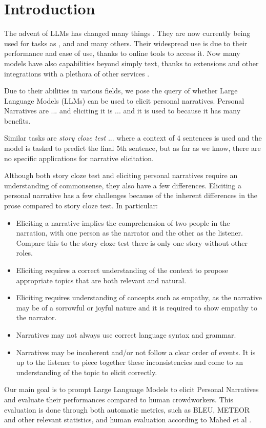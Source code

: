 \chapter{Introduction}
\label{cha:intro}
The advent of LLMs has changed many things \cite{}. They are now currently being used for tasks as \cite{}, \cite{} and \cite{} and many others. Their widespread use is due to their performance and ease of use, thanks to online tools to access it. Now \cite{} many models have also capabilities beyond simply text, thanks to extensions and other integrations with a plethora of other services \cite{}.

Due to their abilities in various fields, we pose the query of whether Large Language Models (LLMs) can be used to elicit personal narratives.
Personal Narratives are ... \cite{} and eliciting it is ...\cite{} and it is used to \cite{} because it has many benefits. 

Similar tasks are \emph{story cloze test} \cite{} ... where a context of 4 sentences is used and the model is tasked to predict the final 5th sentence, but as far as we know, there are no specific applications for narrative elicitation. 

Although both story cloze test and eliciting personal narratives require an understanding of commonsense, they also have a few differences.
Eliciting a personal narrative has a few challenges because of the inherent differences in the prose compared to story cloze test. In particular:
\begin{itemize}
    \item  Eliciting a narrative implies the comprehension of two people in the narration, with one person as the narrator and the other as the listener. Compare this to the story cloze test there is only one story without other roles.
    \item  Eliciting requires a correct understanding of the context to propose appropriate topics that are both relevant and natural.
    \item Eliciting requires understanding of concepts such as empathy, as the narrative may be of a sorrowful or joyful nature and it is required to show empathy to the narrator.
    \item Narratives may not always use correct language syntax and grammar.
    \item Narratives may be incoherent and/or not follow a clear order of events. It is up to the listener to piece together these inconsistencies and come to an understanding of the topic to elicit correctly.
\end{itemize}
Our main goal is to prompt Large Language Models to elicit Personal Narratives and evaluate their performances compared to human crowdworkers. This evaluation is done through both automatic metrics, such as BLEU, METEOR and other relevant statistics, and human evaluation according to Mahed et al \cite{}. 

